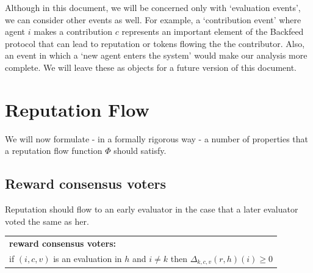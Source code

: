 \documentclass{article}
\newenvironment{condition}[1]
	{
	\begin{center}
	   \begin{tabular}{|p{.9\textwidth}|}
		\hline \medskip
		{\bf #1:}\\
	}
	{
		\medskip \\\hline
	\end{tabular}
	\end{center}
	}
\begin{document}
Although in this document, we will be concerned only with `evaluation events', we can consider other events as well. 
For example, a `contribution event' where agent $i$ makes a contribution $c$ represents an important element of the Backfeed protocol that can lead to reputation or tokens flowing the the contributor. Also, an event in which a `new agent enters the system' would make our analysis more complete.
We will leave these as objects for a future version of this document.

\section{Reputation Flow}

We will now formulate - in a formally rigorous way - a number of properties that a reputation flow function $\Phi$ should satisfy.

\subsection{Reward consensus voters}
Reputation should flow to an early evaluator in the case that a later evaluator voted the same as her.
\begin{condition}{reward consensus voters}
if $(i, c, v)$ is an evaluation in $h$ and $i \neq k$ then $\Delta_{k, c, v}(r, h)(i) \geq 0$
\end{condition}
\end{document}
